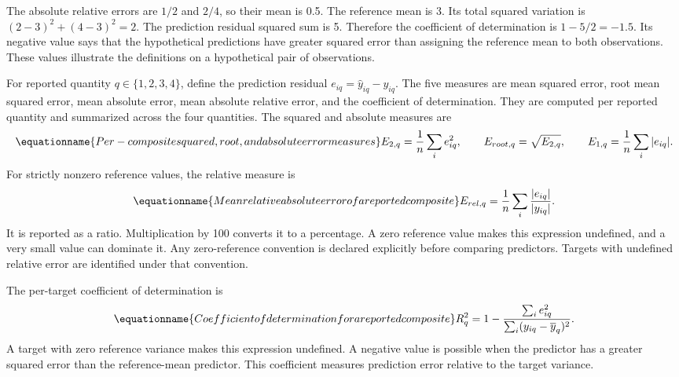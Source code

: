 The absolute relative errors are \(1/2\) and \(2/4\), so their mean is 0.5. The reference mean is 3. Its total squared variation is \((2-3)^2+(4-3)^2=2\). The prediction residual squared sum is 5. Therefore the coefficient of determination is \(1-5/2=-1.5\). Its negative value says that the hypothetical predictions have greater squared error than assigning the reference mean to both observations. These values illustrate the definitions on a hypothetical pair of observations.

For reported quantity \(q\in\{1,2,3,4\}\), define the prediction residual \(e_{iq}=\widehat y_{iq}-y_{iq}\). The five measures are mean squared error, root mean squared error, mean absolute error, mean absolute relative error, and the coefficient of determination. They are computed per reported quantity and summarized across the four quantities. The squared and absolute measures are
\begin{equation}
\equationname{Per-composite squared, root, and absolute error measures}
\label{eq:icsor_composite_error_metrics}
E_{2,q}=\frac{1}{n}\sum_i e_{iq}^{2},
\qquad E_{root,q}=\sqrt{E_{2,q}},
\qquad E_{1,q}=\frac{1}{n}\sum_i|e_{iq}|.
\end{equation}
For strictly nonzero reference values, the relative measure is
\begin{equation}
\equationname{Mean relative absolute error of a reported composite}
\label{eq:icsor_relative_error}
E_{rel,q}=\frac{1}{n}\sum_i\frac{|e_{iq}|}{|y_{iq}|}.
\end{equation}
It is reported as a ratio. Multiplication by 100 converts it to a percentage. A zero reference value makes this expression undefined, and a very small value can dominate it. Any zero-reference convention is declared explicitly before comparing predictors. Targets with undefined relative error are identified under that convention.

The per-target coefficient of determination is
\begin{equation}
\equationname{Coefficient of determination for a reported composite}
\label{eq:icsor_coefficient_determination}
R_q^2=1-
\frac{\sum_i e_{iq}^{2}}
{\sum_i(y_{iq}-\overline y_q)^2}.
\end{equation}
A target with zero reference variance makes this expression undefined. A negative value is possible when the predictor has a greater squared error than the reference-mean predictor. This coefficient measures prediction error relative to the target variance.

